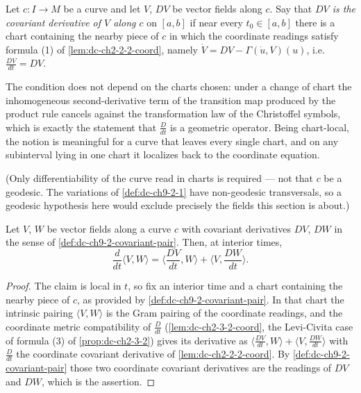 \begin{definition}
  \label{def:dc-ch9-2-covariant-pair}
  \leanok
  Let $c:I\to M$ be a curve and let $V$, $DV$ be vector fields along $c$. Say that
  \emph{$DV$ is the covariant derivative of $V$ along $c$} on $[a,b]$ if near every
  $t_0\in[a,b]$ there is a chart containing the nearby piece of $c$ in which the
  coordinate readings satisfy formula (1) of \cref{lem:dc-ch2-2-2-coord}, namely
  $\dot V=DV-\Gamma(\dot u,V)(u)$, i.e. $\frac{DV}{dt}=DV$.

  The condition does not depend on the charts chosen: under a change of chart the
  inhomogeneous second-derivative term of the transition map produced by the product rule
  cancels against the transformation law of the Christoffel symbols, which is exactly the
  statement that $\frac{D}{dt}$ is a geometric operator. Being chart-local, the notion is
  meaningful for a curve that leaves every single chart, and on any subinterval lying in
  one chart it localizes back to the coordinate equation.

  (Only differentiability of the curve read in charts is required --- not that $c$ be a
  geodesic. The variations of \cref{def:dc-ch9-2-1} have non-geodesic transversals, so a
  geodesic hypothesis here would exclude precisely the fields this section is about.)
\end{definition}
\begin{lemma}
  \label{lem:dc-ch9-2-covariant-pair-leibniz}
  \leanok
  Let $V$, $W$ be vector fields along a curve $c$ with covariant derivatives $DV$, $DW$
  in the sense of \cref{def:dc-ch9-2-covariant-pair}. Then, at interior times,
  $$
  \frac{d}{dt}\langle V,W\rangle=\Big\langle\frac{DV}{dt},W\Big\rangle
    +\Big\langle V,\frac{DW}{dt}\Big\rangle.
  $$
\end{lemma}
\begin{proof}
  \leanok
  \sketch
  The claim is local in $t$, so fix an interior time and a chart containing the nearby
  piece of $c$, as provided by \cref{def:dc-ch9-2-covariant-pair}. In that chart the
  intrinsic pairing $\langle V,W\rangle$ is the Gram pairing of the coordinate readings,
  and the coordinate metric compatibility of $\frac{D}{dt}$ (\cref{lem:dc-ch2-3-2-coord},
  the Levi-Civita case of formula (3) of \cref{prop:dc-ch2-3-2}) gives its derivative as
  $\langle\frac{DV}{dt},W\rangle+\langle V,\frac{DW}{dt}\rangle$ with $\frac{D}{dt}$ the
  coordinate covariant derivative of \cref{lem:dc-ch2-2-2-coord}. By
  \cref{def:dc-ch9-2-covariant-pair} those two coordinate covariant derivatives are the
  readings of $DV$ and $DW$, which is the assertion.
\end{proof}
